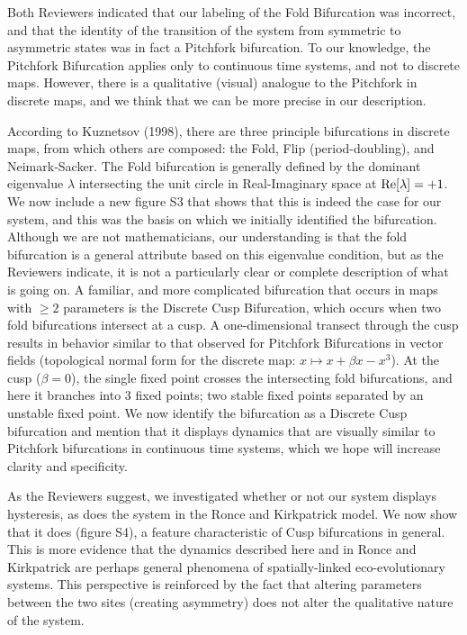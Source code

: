 \documentclass[ucm,12pt]{ucletter}
\begin{document}
\begin{letter}
 Both Reviewers indicated that our labeling of the Fold Bifurcation was incorrect, and that the identity of the transition of the system from symmetric to asymmetric states was in fact a Pitchfork bifurcation. To our knowledge, the Pitchfork Bifurcation applies only to continuous time systems, and not to discrete maps. However, there is a qualitative (visual) analogue to the Pitchfork in discrete maps, and we think that we can be more precise in our description.

According to Kuznetsov (1998), there are three principle bifurcations in discrete maps, from which others are composed: the Fold, Flip (period-doubling), and Neimark-Sacker.
The Fold bifurcation is generally defined by the dominant eigenvalue $\lambda$ intersecting the unit circle in Real-Imaginary space at ${\rm Re}[\lambda]=+1$.
We now include a new figure S3 that shows that this is indeed the case for our system, and this was the basis on which we initially identified the bifurcation. Although we are not mathematicians, our understanding is that the fold bifurcation is a general attribute based on this eigenvalue condition, but as the Reviewers indicate, it is not a particularly clear or complete description of what is going on. 
A familiar, and more complicated bifurcation that occurs in maps with $\geq2$ parameters is the Discrete Cusp Bifurcation, which occurs when two fold bifurcations intersect at a cusp.
A one-dimensional transect through the cusp results in behavior similar to that observed for Pitchfork Bifurcations in vector fields (topological normal form for the discrete map: $x \mapsto x + \beta x - x^3$). At the cusp ($\beta=0$), the single fixed point crosses the intersecting fold bifurcations, and here it branches into 3 fixed points; two stable fixed points separated by an unstable fixed point.
We now identify the bifurcation as a Discrete Cusp bifurcation and mention that it displays dynamics that are visually similar to Pitchfork bifurcations in continuous time systems, which we hope will increase clarity and specificity.


As the Reviewers suggest, we investigated whether or not our system displays hysteresis, as does the system in the Ronce and Kirkpatrick model.
We now show that it does (figure S4), a feature characteristic of Cusp bifurcations in general.
This is more evidence that the dynamics described here and in Ronce and Kirkpatrick are perhaps general phenomena of spatially-linked eco-evolutionary systems.
This perspective is reinforced by the fact that altering parameters between the two sites (creating asymmetry) does not alter the qualitative nature of the system.


\end{letter}
\end{document}
